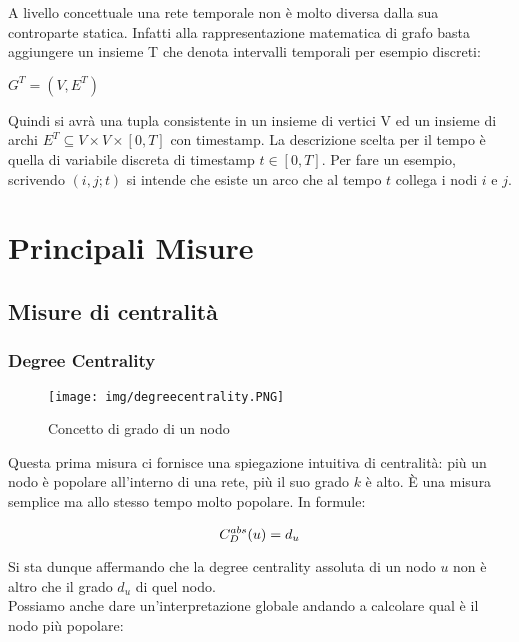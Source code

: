 \documentclass[12pt,twoside]{report}
\begin{document}
	A livello concettuale una rete temporale non è molto diversa dalla sua controparte statica. Infatti alla rappresentazione matematica di grafo basta aggiungere un insieme T che denota intervalli temporali per esempio discreti:
	
	\begin{center}
	    \large$G^T = (V, E^T)$ 
	\end{center}
	
	Quindi si avrà una tupla consistente in un insieme di vertici V ed un insieme di archi $E^T \subseteq V \times V \times [0,T] $ con timestamp. La descrizione scelta per il tempo è quella di variabile discreta di timestamp $t \in [0,T]$. Per fare un esempio, scrivendo $(i,j;t)$ si intende che esiste un arco che al tempo $t$ collega i nodi $i$ e $j$.
	
\section{Principali Misure}
	\subsection{Misure di centralità}
    
    \subsubsection{Degree Centrality}
    
    \begin{figure}[htb]
    	\hfill\texttt{[image: img/degreecentrality.PNG]}\hfill
    	\label{fig:Adj1}
    	\caption{Concetto di grado di un nodo}
    \end{figure}
    
    \FloatBarrier
    
    Questa prima misura ci fornisce una spiegazione intuitiva di centralità: più un nodo è popolare all'interno di una rete, più il suo grado $k$ è alto. È una misura semplice ma allo stesso tempo molto popolare. In formule:
    
    \begin{equation}
    \large
        C_D^{abs}(u) = d_u 
    \end{equation}\vspace{0.8em}
    
    Si sta dunque affermando che la degree centrality assoluta di un nodo $u$ non è altro che il grado $d_u$ di quel nodo.\\ Possiamo anche dare un'interpretazione globale andando a calcolare qual è il nodo più popolare:
    
\end{document}
